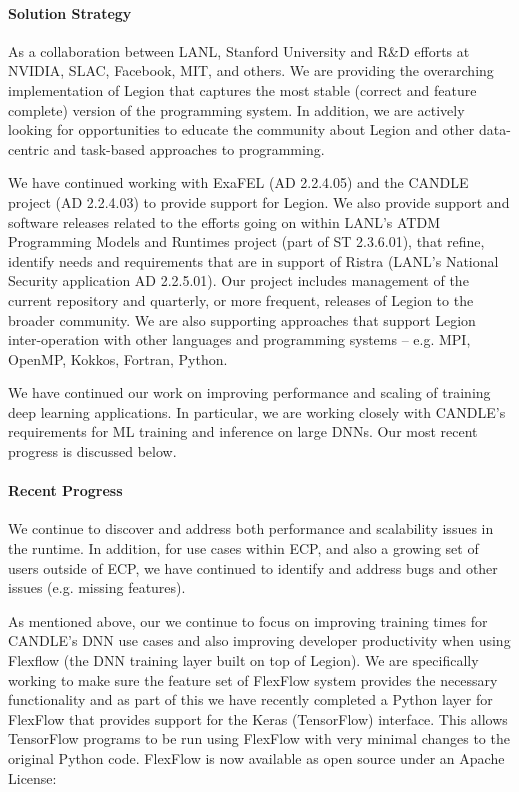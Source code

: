 \paragraph{Solution Strategy}
As a collaboration between LANL, Stanford University and R\&D
efforts at NVIDIA, SLAC, Facebook, MIT, and others.  We are providing
the overarching implementation of Legion that captures the most stable
(correct and feature complete) version of the programming system.  In
addition, we are actively looking for opportunities to educate the
community about Legion and other data-centric and task-based
approaches to programming.

We have continued working with ExaFEL (AD 2.2.4.05) and the CANDLE
project (AD 2.2.4.03) to provide support for Legion.  We also provide
support and software releases related to the efforts going on within
LANL's ATDM Programming Models and Runtimes project (part of ST
2.3.6.01), that refine, identify needs and requirements that are in
support of Ristra (LANL's National Security application AD 2.2.5.01).
Our project includes management of the current repository and
quarterly, or more frequent, releases of Legion to the broader
community.  We are also supporting approaches that support Legion
inter-operation with other languages and programming systems --
e.g. MPI, OpenMP, Kokkos, Fortran, Python.

We have continued our work on improving performance and scaling of
training deep learning applications.  In particular, we are working
closely with CANDLE's requirements for ML training and inference on
large DNNs. Our most recent progress is discussed below. 

\paragraph{Recent Progress}

We continue to discover and address both performance and scalability
issues in the runtime.  In addition, for use cases within ECP, and
also a growing set of users outside of ECP, we have continued to
identify and address bugs and other issues (e.g. missing features).

As mentioned above, our we continue to focus on improving training
times for CANDLE's DNN use cases and also improving developer productivity
when using Flexflow (the DNN training layer built on top of Legion).  
We are specifically working to make sure the feature set of FlexFlow system
provides the necessary functionality and as part of this we have recently
completed a Python layer for FlexFlow that provides support for the Keras
(TensorFlow) interface.  This allows TensorFlow programs to be run using
FlexFlow with very minimal changes to the original Python code.  FlexFlow
is now available as open source under an Apache License:

